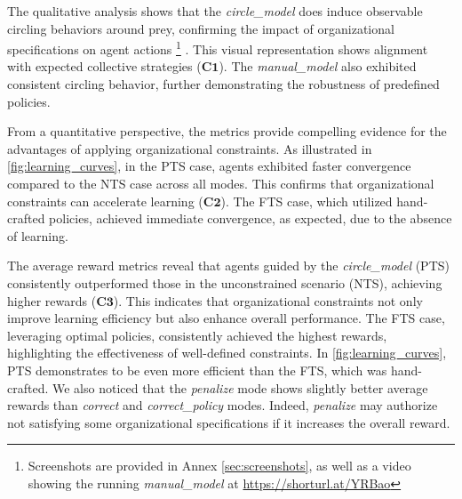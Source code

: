 \documentclass[sigconf,anonymous]{aamas}
\begin{document}
%
%
%
The qualitative analysis shows that the \textit{circle\_model} does induce observable circling behaviors around prey, confirming the impact of organizational specifications on agent actions%
\footnote{Screenshots are provided in Annex \ref{sec:screenshots}, as well as a video showing the running \textit{manual\_model} at \url{https://shorturl.at/YRBao}}%
. This visual representation shows alignment with expected collective strategies ($\mathbf{C1}$). The \textit{manual\_model} also exhibited consistent circling behavior, further demonstrating the robustness of predefined policies.

From a quantitative perspective, the metrics provide compelling evidence for the advantages of applying organizational constraints. As illustrated in \autoref{fig:learning_curves}, in the PTS case, agents exhibited faster convergence compared to the NTS case across all modes. This confirms that organizational constraints can accelerate learning ($\mathbf{C2}$). The FTS case, which utilized hand-crafted policies, achieved immediate convergence, as expected, due to the absence of learning.

The average reward metrics reveal that agents guided by the \textit{circle\_model} (PTS) consistently outperformed those in the unconstrained scenario (NTS), achieving higher rewards ($\mathbf{C3}$). This indicates that organizational constraints not only improve learning efficiency but also enhance overall performance. The FTS case, leveraging optimal policies, consistently achieved the highest rewards, highlighting the effectiveness of well-defined constraints. In \autoref{fig:learning_curves}, PTS demonstrates to be even more efficient than the FTS, which was hand-crafted. We also noticed that the \textit{penalize} mode shows slightly better average rewards than \textit{correct} and \textit{correct\_policy} modes. Indeed, \textit{penalize} may authorize not satisfying some organizational specifications if it increases the overall reward.
\end{document}
